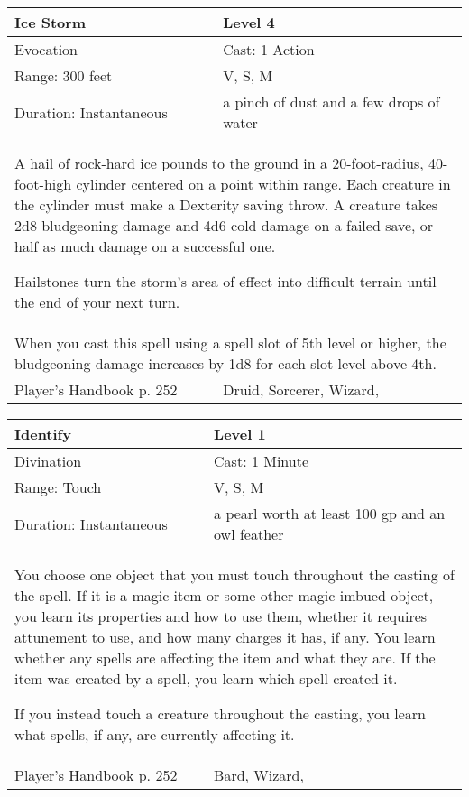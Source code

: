 \documentclass[11pt]{report}
\begin{document}
\begin{table}[H]
	\begin{tabular}{||p{6cm}|p{6cm}||}
		\hline\hline
		\bf{Ice Storm} & Level 4\\ \hline
		Evocation & Cast: 1 Action\\ \hline
		Range: 300 feet & V, S, M\\ \hline
		Duration: Instantaneous & a pinch of dust and a few drops of water\\ \hline
		\multicolumn{2}{||p{12cm}||}{A hail of rock-hard ice pounds to the ground in a 20-foot-radius, 40-foot-high cylinder centered on a point within range. 
Each creature in the cylinder must make a Dexterity saving throw. A creature takes 2d8 bludgeoning damage and 4d6 cold damage on a failed save, or half as much damage on a successful one.

Hailstones turn the storm’s area of effect into difficult terrain until the end of your next turn.}\\ \hline
		\multicolumn{2}{||p{12cm}||}{When you cast this spell using a spell slot of 5th level or higher, the bludgeoning damage increases by 1d8 for each slot level above 4th.}\\ \hline
Player's Handbook p. 252 & Druid, Sorcerer, Wizard, \\ \hline\hline
	\end{tabular}
\end{table}

\begin{table}[H]
	\begin{tabular}{||p{6cm}|p{6cm}||}
		\hline\hline
		\bf{Identify} & Level 1\\ \hline
		Divination & Cast: 1 Minute\\ \hline
		Range: Touch & V, S, M\\ \hline
		Duration: Instantaneous & a pearl worth at least 100 gp and an owl feather\\ \hline
		\multicolumn{2}{||p{12cm}||}{You choose one object that you must touch throughout the casting of the spell. If it is a magic item or some other magic-imbued object, you learn its properties and how to use them, whether it requires attunement to use, and how many charges it has, if any. You learn whether any spells are affecting the item and what they are. If the item was created by a spell, you learn which spell created it.

If you instead touch a creature throughout the casting, you learn what spells, if any, are currently affecting it.}\\ \hline
Player's Handbook p. 252 & Bard, Wizard, \\ \hline\hline
	\end{tabular}
\end{table}
\end{document}
